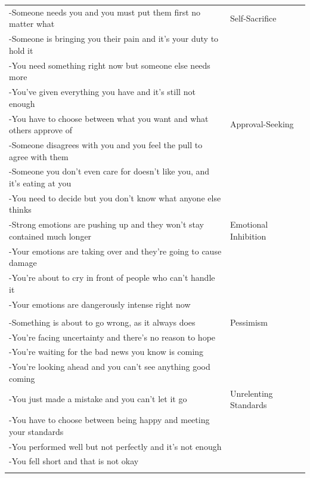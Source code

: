 \documentclass[11pt,oneside]{book}
\begin{document}
\begin{longtable}{>{\raggedright}p{} p{}}
-Someone needs you and you must put them first no matter what & Self-Sacrifice \\
-Someone is bringing you their pain and it's your duty to hold it &  \\
-You need something right now but someone else needs more &  \\
-You've given everything you have and it's still not enough &  \\
\addlinespace

-You have to choose between what you want and what others approve of & Approval-Seeking \\
-Someone disagrees with you and you feel the pull to agree with them &  \\
-Someone you don't even care for doesn't like you, and it's eating at you &  \\
-You need to decide but you don't know what anyone else thinks &  \\
\addlinespace

-Strong emotions are pushing up and they won't stay contained much longer & Emotional Inhibition \\
-Your emotions are taking over and they're going to cause damage &  \\
-You're about to cry in front of people who can't handle it &  \\
-Your emotions are dangerously intense right now &  \\

\midrule
\multicolumn{2}{l}{\textbf{Spontaneity \& Play}} \\
\midrule

-Something is about to go wrong, as it always does & Pessimism \\
-You're facing uncertainty and there's no reason to hope &  \\
-You're waiting for the bad news you know is coming &  \\
-You're looking ahead and you can't see anything good coming &  \\
\addlinespace

-You just made a mistake and you can't let it go & Unrelenting Standards \\
-You have to choose between being happy and meeting your standards &  \\
-You performed well but not perfectly and it's not enough &  \\
-You fell short and that is not okay &  \\
\addlinespace


\end{longtable}
\end{document}
